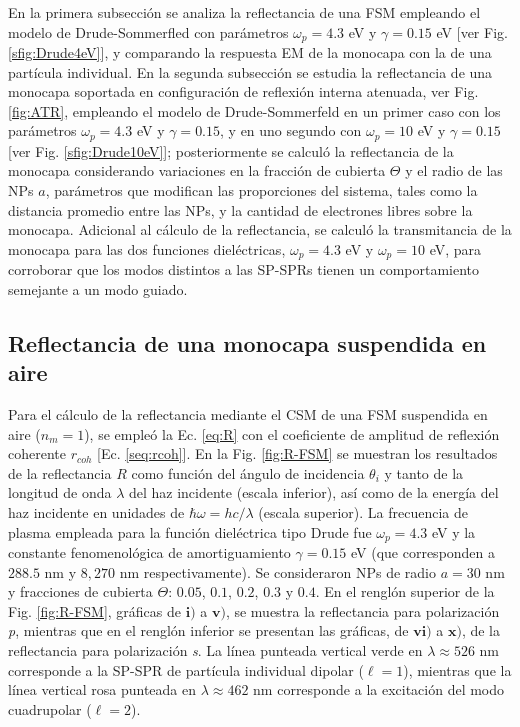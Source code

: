  En la primera subsección se analiza la reflectancia de una FSM empleando el modelo de Drude-Sommerfled con parámetros $\omega_p = 4.3$ eV y  $\gamma = 0.15$ eV [ver Fig. \ref{sfig:Drude4eV}], y comparando la respuesta EM de la monocapa con la de una partícula individual. En la segunda subsección se estudia la reflectancia de una monocapa soportada en configuración de reflexión interna atenuada, ver Fig. \ref{fig:ATR}, empleando el modelo de Drude-Sommerfeld en un primer caso con los parámetros  $\omega_p = 4.3$ eV y  $\gamma = 0.15$, y en uno segundo con $\omega_p = 10$ eV y $\gamma = 0.15$  [ver Fig. \ref{sfig:Drude10eV}]; posteriormente se calculó la reflectancia de la monocapa considerando  variaciones en la fracción de cubierta $\Theta$ y el radio de las NPs $a$, parámetros que modifican las proporciones del sistema, tales como la distancia promedio entre las NPs, y la cantidad de electrones libres sobre la monocapa. Adicional al cálculo de la reflectancia, se calculó la transmitancia de la monocapa para las dos funciones dieléctricas, $\omega_p =4.3$ eV y $\omega_p =10$ eV, para corroborar que los modos distintos a las SP-SPRs tienen un comportamiento semejante a un modo guiado. 
	
	\subsection{Reflectancia de una monocapa suspendida en aire}
	\label{ssection:DrudeFSM}
	
	
Para el cálculo de la reflectancia mediante el CSM de una FSM suspendida en aire ($n_m=1$), se empleó la Ec.  \eqref{eq:R} con el coeficiente de amplitud de reflexión coherente $r_{coh}$ [Ec.  \eqref{seq:rcoh}].  En la Fig.  \ref{fig:R-FSM} se muestran los resultados de la reflectancia $R$ como función del ángulo de incidencia $\theta_i$ y tanto de la longitud de onda $\lambda$ del haz incidente (escala inferior), así como de la energía del haz incidente en unidades de $\hbar\omega = h c /\lambda$ (escala superior).  La frecuencia de plasma empleada para la función dieléctrica tipo Drude fue $\omega_p = 4. 3$ eV y la constante fenomenológica de amortiguamiento $\gamma = 0. 15$ eV (que corresponden a $288. 5$ nm  y $8,270$ nm respectivamente). Se consideraron NPs de radio $a=30$ nm y fracciones de cubierta $\Theta$: $0. 05$, $0. 1$, $0. 2$, $0. 3$ y $0. 4$. En el renglón superior de la Fig. \ref{fig:R-FSM}, gráficas de $\mathbf{i)}$ a $\mathbf{v)}$, se muestra la reflectancia para polarización \emph{p}, mientras que en el renglón inferior se presentan las gráficas, de $\mathbf{vi)}$ a $\mathbf{x)}$, de la reflectancia para polarización \emph{s}. La línea punteada vertical verde  en $\lambda \approx 526$ nm corresponde a la SP-SPR de partícula individual dipolar ($\ell = 1$), mientras que la línea vertical rosa punteada en $\lambda \approx 462$ nm corresponde a la excitación del modo cuadrupolar ($\ell=2$).
					
